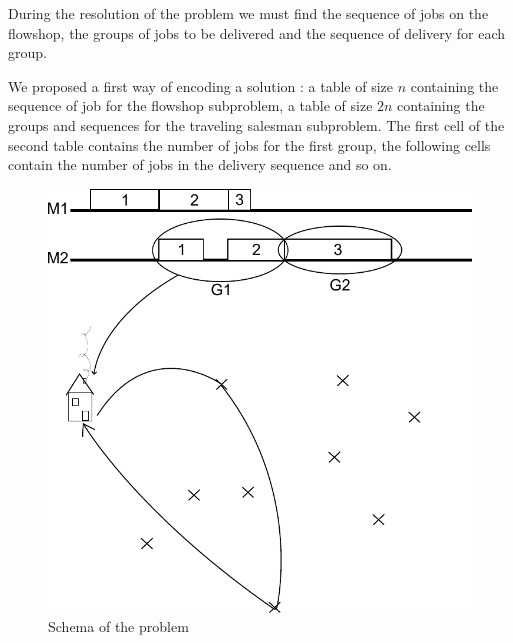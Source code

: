 \documentclass[UTF8, twoside]{EPURapport}
\begin{document}
	During the resolution of the problem we must find the sequence of jobs on the flowshop, the groups of jobs to be delivered and the sequence of delivery for each group.

	We proposed a first way of encoding a solution : a table of size $n$ containing the sequence of job for the flowshop subproblem, a table of size $2n$ containing the groups and sequences for the traveling salesman subproblem. The first cell of the second table contains the number of jobs for the first group, the following cells contain the number of jobs in the delivery sequence and so on.
	
\begin{figure}
	\centering \includegraphics{images/problem.pdf}
	\caption {Schema of the problem}	
	\label {problem}
\end{figure}
\end{document}
